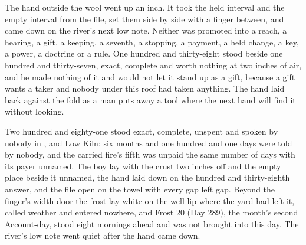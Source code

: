The hand outside the wool went up an inch. It took the held interval and the empty interval from the file, set them side by side with a finger between, and came down on the river's next low note. Neither was promoted into a reach, a hearing, a gift, a keeping, a seventh, a stopping, a payment, a held change, a key, a power, a doctrine or a rule. One hundred and thirty-eight stood beside one hundred and thirty-seven, exact, complete and worth nothing at two inches of air, and he made nothing of it and would not let it stand up as a gift, because a gift wants a taker and nobody under this roof had taken anything. The hand laid back against the fold as a man puts away a tool where the next hand will find it without looking.

Two hundred and eighty-one stood exact, complete, unspent and spoken by nobody in ,  and Low Kiln; six months and one hundred and one days were told by nobody, and the carried fire's fifth was unpaid the same number of days with its payer unnamed. The boy lay with the crust two inches off and the empty place beside it unnamed, the hand laid down on the hundred and thirty-eighth answer, and the file open on the towel with every gap left gap. Beyond the finger's-width door the frost lay white on the well lip where the yard had left it, called weather and entered nowhere, and Frost 20 (Day 289), the month's second Account-day, stood eight mornings ahead and was not brought into this day. The river's low note went quiet after the hand came down.

